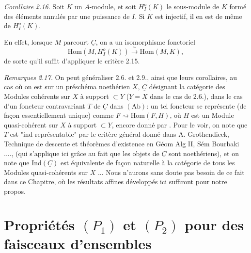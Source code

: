 \documentclass[11pt,a4paper]{article}
\begin{document}
\emph{Corollaire 2.16.} Soit $K$ un $A$-module, et soit $H^{o}_{I}(K)$ le sous-module de $K$ formé des éléments annulés par une puissance de $I$. Si $K$ est injectif, il en est de même de $H^{o}_{I}(K)$.

En effet, lorsque $M$ parcourt $\underline{C}$, on a un isomorphisme fonctoriel
\[
  \mathrm{Hom}(M, H^{o}_{I}(K)) \xrightarrow{\;\sim\;} \mathrm{Hom}(M,K) ,
\]
de sorte qu'il suffit d'appliquer le critère 2.15.


\emph{Remarques 2.17.} On peut généraliser 2.6. et 2.9., ainsi que leurs corollaires, au cas où on est sur un préschéma noethérien $X$, $\underline{C}$ désignant la catégorie des Modules cohérents sur $X$ à support $\subset Y$ ($Y = X$ dans le cas  de 2.6.), dans le cas d'un foncteur contravariant  $T$ de $\underline{C}$ dans $(\mathrm{Ab})$: un tel foncteur  se représente (de façon essentiellement unique) comme $F \rightsquigarrow \mathrm{Hom}(F,H)$, où $H$ est un Module quasi-cohérent sur $X$ à support $\subset Y$, encore donné par . Pour le voir, on note que $T$ est "ind-représentable" par le critère général donné dans A. Grothendieck, Technique de descente et théorèmes d'existence en Géom Alg II, Sém Bourbaki ...., (qui s'applique ici grâce au fait que les objets de $\underline{C}$ sont noethériens), et on note que $\mathrm{Ind}(\underline{C})$ est équivalente de façon naturelle à la catégorie de tous les Modules quasi-cohérents sur $X$ ... Nous n'aurons sans doute pas besoin de ce fait dans ce Chapitre, où les résultats affines développés ici suffiront pour notre propos.



\section{Propriétés $(P_1)$ et $(P_2)$ pour des faisceaux d'ensembles}

\end{document}
